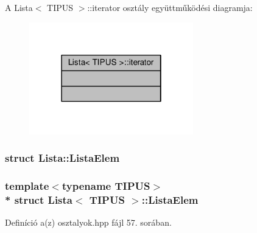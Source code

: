 A Lista$<$ T\+I\+P\+US $>$\+:\+:iterator osztály együttműködési diagramja\+:\nopagebreak
\begin{figure}[H]
\begin{center}
\leavevmode
\includegraphics[width=202pt]{classLista_1_1iterator__coll__graph}
\end{center}
\end{figure}
\label{structLista_1_1ListaElem}
\hypertarget{classLista_structLista_1_1ListaElem}{}
\subsubsection{struct Lista\+:\+:Lista\+Elem}
\subsubsection*{template$<$typename T\+I\+P\+US$>$\\*
struct Lista$<$ T\+I\+P\+U\+S $>$\+::\+Lista\+Elem}



Definíció a(z) osztalyok.\+hpp fájl 57. sorában.



